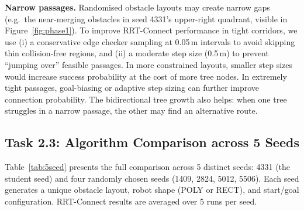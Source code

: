 \documentclass[11pt,a4paper]{article}
\begin{document}
\textbf{Narrow passages.}
Randomised obstacle layouts may create narrow gaps (e.g.\ the near-merging obstacles in seed 4331's upper-right quadrant, visible in Figure~\ref{fig:phase1}). To improve RRT-Connect performance in tight corridors, we use (i) a conservative edge checker sampling at 0.05\,m intervals to avoid skipping thin collision-free regions, and (ii) a moderate step size (0.5\,m) to prevent ``jumping over'' feasible passages. In more constrained layouts, smaller step sizes would increase success probability at the cost of more tree nodes. In extremely tight passages, goal-biasing or adaptive step sizing can further improve connection probability. The bidirectional tree growth also helps: when one tree struggles in a narrow passage, the other may find an alternative route.

\subsection{Task 2.3: Algorithm Comparison across 5 Seeds}

Table~\ref{tab:5seed} presents the full comparison across 5 distinct seeds: 4331 (the student seed) and four randomly chosen seeds (1409, 2824, 5012, 5506). Each seed generates a unique obstacle layout, robot shape (POLY or RECT), and start/goal configuration. RRT-Connect results are averaged over 5 runs per seed.
\end{document}
